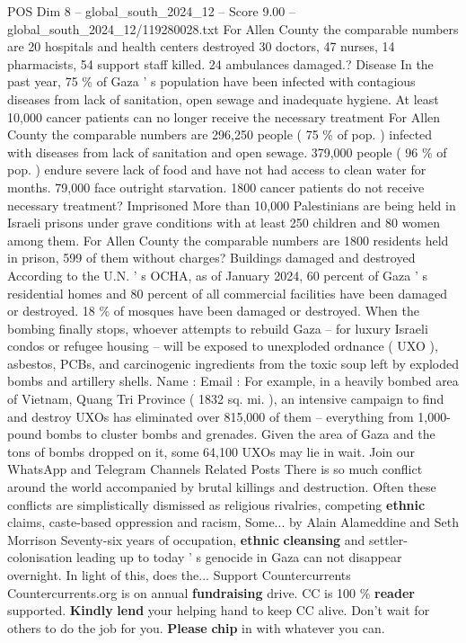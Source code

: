 \begin{textsample}{POS Dim 8 – global\_south\_2024\_12 – Score 9.00 – global\_south\_2024\_12/119280028.txt}
For Allen County the comparable numbers are 20 hospitals and health centers destroyed 30 doctors, 47 nurses, 14 pharmacists, 54 support staff killed. 24 ambulances damaged.?
Disease In the past year, 75 \% of Gaza ' s population have been infected with contagious diseases from lack of sanitation, open sewage and inadequate hygiene.
At least 10,000 cancer patients can no longer receive the necessary treatment For Allen County the comparable numbers are 296,250 people ( 75 \% of pop. ) infected with diseases from lack of sanitation and open sewage. 379,000 people ( 96 \% of pop. ) endure severe lack of food and have not had access to clean water for months. 79,000 face outright starvation. 1800 cancer patients do not receive necessary treatment?
Imprisoned More than 10,000 Palestinians are being held in Israeli prisons under grave conditions with at least 250 children and 80 women among them.
For Allen County the comparable numbers are 1800 residents held in prison, 599 of them without charges?
Buildings damaged and destroyed According to the U.N. ' s OCHA, as of January 2024, 60 percent of Gaza ' s residential homes and 80 percent of all commercial facilities have been damaged or destroyed. 18 \% of mosques have been damaged or destroyed.
When the bombing finally stops, whoever attempts to rebuild Gaza -- for luxury Israeli condos or refugee housing -- will be exposed to unexploded ordnance ( UXO ), asbestos, PCBs, and carcinogenic ingredients from the toxic soup left by exploded bombs and artillery shells.
Name : Email : For example, in a heavily bombed area of Vietnam, Quang Tri Province ( 1832 sq. mi. ), an intensive campaign to find and destroy UXOs has eliminated over 815,000 of them -- everything from 1,000-pound bombs to cluster bombs and grenades.
Given the area of Gaza and the tons of bombs dropped on it, some 64,100 UXOs may lie in wait.
Join our WhatsApp and Telegram Channels Related Posts There is so much conflict around the world accompanied by brutal killings and destruction.
Often these conflicts are simplistically dismissed as religious rivalries, competing \textbf{ethnic} claims, caste-based oppression and racism, Some... by Alain Alameddine and Seth Morrison Seventy-six years of occupation, \textbf{ethnic} \textbf{cleansing} and settler-colonisation leading up to today ' s genocide in Gaza can not disappear overnight.
In light of this, does the...
Support Countercurrents Countercurrents.org is on annual \textbf{fundraising} drive.
CC is 100 \% \textbf{reader} supported. \textbf{Kindly} \textbf{lend} your helping hand to keep CC alive.
Don't wait for others to do the job for you. \textbf{Please} \textbf{chip} in with whatever you can.

\end{textsample}
